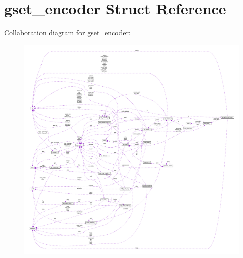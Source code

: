 \hypertarget{structgset__encoder}{}\section{gset\+\_\+encoder Struct Reference}
\label{structgset__encoder}


Collaboration diagram for gset\+\_\+encoder\+:
\nopagebreak
\begin{figure}[H]
\begin{center}
\leavevmode
\includegraphics[width=350pt]{structgset__encoder__coll__graph}
\end{center}
\end{figure}
